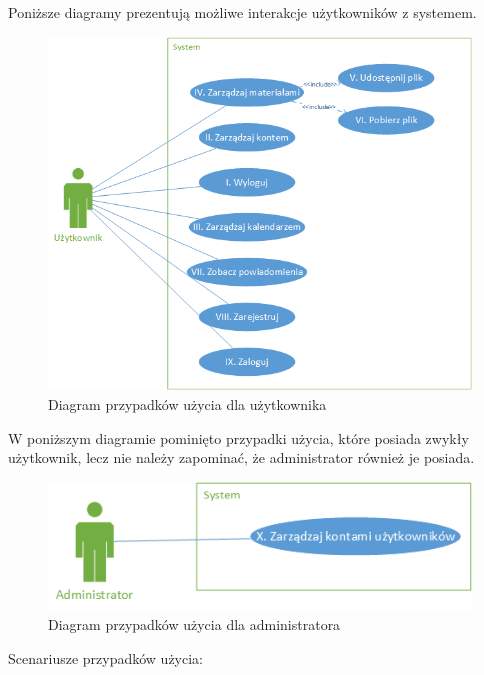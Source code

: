 Poniższe diagramy prezentują możliwe interakcje użytkowników z systemem.
\begin{figure}[H]
	\centering
	\includegraphics[scale=0.7]{UseCaseUser}
	\caption{\label{fig:caption_01}Diagram przypadków użycia dla użytkownika}
\end{figure}
W poniższym diagramie pominięto przypadki użycia, które posiada zwykły użytkownik, lecz nie należy zapominać, że administrator również je posiada.
\begin{figure}[H]
	\centering
	\includegraphics[scale=0.7]{UseCaseAdmin.png}
	\caption{\label{fig:caption_02}Diagram przypadków użycia dla administratora}
\end{figure}

Scenariusze przypadków użycia:

